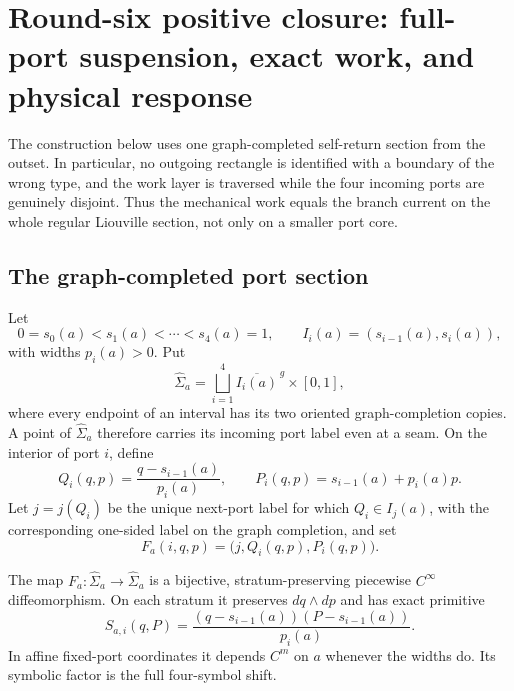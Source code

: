 \section{Round-six positive closure: full-port suspension, exact work, and physical response}
\label{sec:r6-a1}

The construction below uses one graph-completed self-return section from the
outset.  In particular, no outgoing rectangle is identified with a boundary
of the wrong type, and the work layer is traversed while the four incoming
ports are genuinely disjoint.  Thus the mechanical work equals the branch
current on the whole regular Liouville section, not only on a smaller port
core.

\subsection{The graph-completed port section}

Let
\[
0=s_0(a)<s_1(a)<\cdots<s_4(a)=1,
\qquad I_i(a)=(s_{i-1}(a),s_i(a)),
\]
with widths \(p_i(a)>0\).  Put
\[
\widehat\Sigma_a=\bigsqcup_{i=1}^4
\overline{I_i(a)}^{\,g}\times[0,1],
\]
where every endpoint of an interval has its two oriented graph-completion
copies.  A point of \(\widehat\Sigma_a\) therefore carries its incoming port
label even at a seam.  On the interior of port \(i\), define
\[
Q_i(q,p)=\frac{q-s_{i-1}(a)}{p_i(a)},
\qquad
P_i(q,p)=s_{i-1}(a)+p_i(a)p.
\]
Let \(j=j(Q_i)\) be the unique next-port label for which
\(Q_i\in I_j(a)\), with the corresponding one-sided label on the graph
completion, and set
\[
F_a(i,q,p)=\bigl(j,Q_i(q,p),P_i(q,p)\bigr).
\]

\begin{lemma}
\label{lem:r6-a1-section}
The map \(F_a:\widehat\Sigma_a\to\widehat\Sigma_a\) is a bijective,
stratum-preserving piecewise \(C^\infty\) diffeomorphism.  On each stratum it
preserves \(dq\wedge dp\) and has exact primitive
\[
S_{a,i}(q,P)=
\frac{(q-s_{i-1}(a))(P-s_{i-1}(a))}{p_i(a)}.
\]
In affine fixed-port coordinates it depends \(C^m\) on \(a\) whenever the
widths do.  Its symbolic factor is the full four-symbol shift.
\end{lemma}


